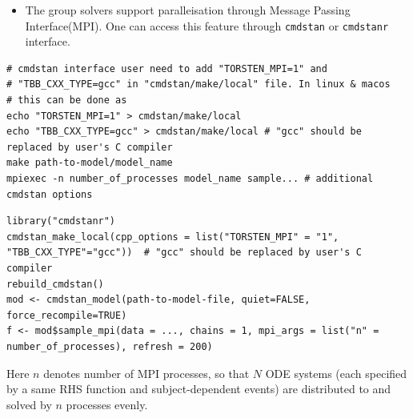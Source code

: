 \documentclass[10pt, reqno, oneside]{amsbook}
\numberwithin{equation}{chapter}
\numberwithin{figure}{chapter}
\numberwithin{table}{chapter}
\theoremstyle{remark}
\begin{document}
\begin{itemize}
\item The group solvers support paralleisation through Message Passing
Interface(MPI). One can access this feature through \texttt{cmdstan} or
\texttt{cmdstanr} interface.
\end{itemize}
\begin{verbatim}
# cmdstan interface user need to add "TORSTEN_MPI=1" and
# "TBB_CXX_TYPE=gcc" in "cmdstan/make/local" file. In linux & macos
# this can be done as
echo "TORSTEN_MPI=1" > cmdstan/make/local
echo "TBB_CXX_TYPE=gcc" > cmdstan/make/local # "gcc" should be replaced by user's C compiler
make path-to-model/model_name
mpiexec -n number_of_processes model_name sample... # additional cmdstan options
\end{verbatim}
\begin{verbatim}
library("cmdstanr")
cmdstan_make_local(cpp_options = list("TORSTEN_MPI" = "1", "TBB_CXX_TYPE"="gcc"))  # "gcc" should be replaced by user's C compiler
rebuild_cmdstan()
mod <- cmdstan_model(path-to-model-file, quiet=FALSE, force_recompile=TRUE)
f <- mod$sample_mpi(data = ..., chains = 1, mpi_args = list("n" = number_of_processes), refresh = 200)
\end{verbatim}
Here \(n\) denotes number of MPI processes, so that \(N\)
ODE systems (each specified by a same RHS function and
subject-dependent events) are distributed to and solved by \(n\) processes evenly.
\end{document}
